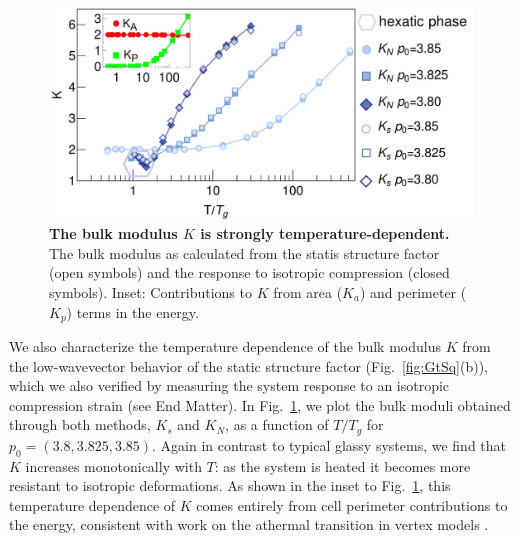 \documentclass[aps,reprint,superscriptaddress,nofootinbib, notitlepage,prl]{revtex4-2}
\begin{document}
\begin{figure}[t]
	\centering
	\includegraphics[width=1\linewidth]{K.jpg}
	\caption{\textbf{The bulk modulus $K$ is strongly temperature-dependent.}
		The bulk modulus as calculated from the statis structure factor (open symbols) and the response to isotropic compression (closed symbols).
		Inset: Contributions to $K$ from area ($K_a$) and perimeter ($K_p$) terms in the energy.
	}
	\label{fig:K}
\end{figure}

We also characterize the temperature dependence of the bulk modulus $K$ from the low-wavevector behavior of the static structure factor (Fig.~\ref{fig:GtSq}(b)), which we also verified by measuring the system response to an isotropic compression strain (see End Matter).
In Fig.~\ref{fig:K}, we plot the bulk moduli obtained through both methods, $K_s$ and $K_N$, as a function of $T/T_g$ for $p_0=(3.8,3.825,3.85)$.
Again in contrast to typical glassy systems, we find that $K$ increases monotonically with $T$: as the system is heated it becomes more resistant to isotropic deformations.
As shown in the inset to Fig.~\ref{fig:K}, this temperature dependence of $K$ comes entirely from cell perimeter contributions to the energy, consistent with work on the athermal transition in vertex models \cite{sussman2018no,Merkel2019}.
\end{document}

